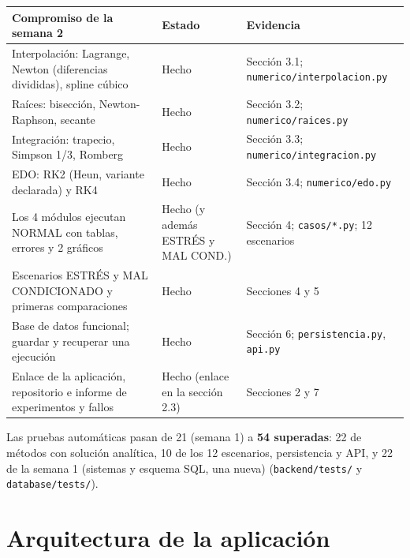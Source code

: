 \documentclass[11pt,letterpaper]{article}
\begin{document}
{\small
\begin{longtable}{p{6.0cm}p{2.6cm}p{6.6cm}}
\toprule
\textbf{Compromiso de la semana 2} & \textbf{Estado} & \textbf{Evidencia}\\
\midrule
Interpolación: Lagrange, Newton (diferencias divididas), spline cúbico & Hecho & Sección 3.1; \texttt{numerico/interpolacion.py}\\
Raíces: bisección, Newton-Raphson, secante & Hecho & Sección 3.2; \texttt{numerico/raices.py}\\
Integración: trapecio, Simpson 1/3, Romberg & Hecho & Sección 3.3; \texttt{numerico/integracion.py}\\
EDO: RK2 (Heun, variante declarada) y RK4 & Hecho & Sección 3.4; \texttt{numerico/edo.py}\\
Los 4 módulos ejecutan NORMAL con tablas, errores y 2 gráficos & Hecho (y además ESTRÉS y MAL COND.) & Sección 4; \texttt{casos/*.py}; 12 escenarios\\
Escenarios ESTRÉS y MAL CONDICIONADO y primeras comparaciones & Hecho & Secciones 4 y 5\\
Base de datos funcional; guardar y recuperar una ejecución & Hecho & Sección 6; \texttt{persistencia.py}, \texttt{api.py}\\
Enlace de la aplicación, repositorio e informe de experimentos y fallos & Hecho (enlace en la sección 2.3) & Secciones 2 y 7\\
\bottomrule
\end{longtable}}

Las pruebas automáticas pasan de 21 (semana 1) a \textbf{54 superadas}: 22 de métodos con solución analítica, 10 de los 12 escenarios, persistencia y API, y 22 de la semana 1 (sistemas y esquema SQL, una nueva) (\texttt{backend/tests/} y \texttt{database/tests/}).

\section{Arquitectura de la aplicación}
\end{document}
